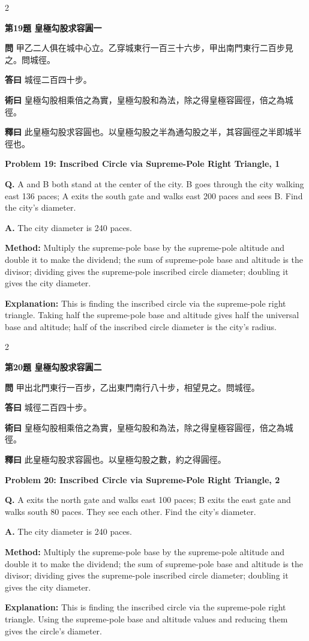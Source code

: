 \documentclass[11pt,a4paper]{article}
\newcommand{\wen}[1]{\noindent\textbf{問} #1\par\smallskip}
\newcommand{\da}[1]{\noindent\textbf{答曰} #1\par\smallskip}
\newcommand{\shu}[1]{\noindent\textbf{術曰} #1\par\smallskip}
\newcommand{\shi}[1]{\noindent\textbf{釋曰} #1\par\smallskip}
\newcommand{\wenE}[1]{\noindent\textbf{Q.} #1\par\smallskip}
\newcommand{\daE}[1]{\noindent\textbf{A.} #1\par\smallskip}
\newcommand{\shuE}[1]{\noindent\textbf{Method:} #1\par\smallskip}
\newcommand{\shiE}[1]{\noindent\textbf{Explanation:} #1\par\smallskip}
\begin{document}
\bigskip

\begin{paracol}{2}

\noindent\textbf{第19題 皇極勾股求容圓一}

\wen{甲乙二人俱在城中心立。乙穿城東行一百三十六步，甲出南門東行二百步見之。問城徑。}
\da{城徑二百四十步。}
\shu{皇極勾股相乘倍之為實，皇極勾股和為法，除之得皇極容圓徑，倍之為城徑。}
\shi{此皇極勾股求容圓也。以皇極勾股之半為通勾股之半，其容圓徑之半即城半徑也。}

\switchcolumn

\noindent\textbf{Problem 19: Inscribed Circle via Supreme-Pole Right Triangle, 1}

\wenE{A and B both stand at the center of the city. B goes through the city walking east 136 paces; A exits the south gate and walks east 200 paces and sees B. Find the city's diameter.}
\daE{The city diameter is 240 paces.}
\shuE{Multiply the supreme-pole base by the supreme-pole altitude and double it to make the dividend; the sum of supreme-pole base and altitude is the divisor; dividing gives the supreme-pole inscribed circle diameter; doubling it gives the city diameter.}
\shiE{This is finding the inscribed circle via the supreme-pole right triangle. Taking half the supreme-pole base and altitude gives half the universal base and altitude; half of the inscribed circle diameter is the city's radius.}

\end{paracol}

\bigskip

\begin{paracol}{2}

\noindent\textbf{第20題 皇極勾股求容圓二}

\wen{甲出北門東行一百步，乙出東門南行八十步，相望見之。問城徑。}
\da{城徑二百四十步。}
\shu{皇極勾股相乘倍之為實，皇極勾股和為法，除之得皇極容圓徑，倍之為城徑。}
\shi{此皇極勾股求容圓也。以皇極勾股之數，約之得圓徑。}

\switchcolumn

\noindent\textbf{Problem 20: Inscribed Circle via Supreme-Pole Right Triangle, 2}

\wenE{A exits the north gate and walks east 100 paces; B exits the east gate and walks south 80 paces. They see each other. Find the city's diameter.}
\daE{The city diameter is 240 paces.}
\shuE{Multiply the supreme-pole base by the supreme-pole altitude and double it to make the dividend; the sum of supreme-pole base and altitude is the divisor; dividing gives the supreme-pole inscribed circle diameter; doubling it gives the city diameter.}
\shiE{This is finding the inscribed circle via the supreme-pole right triangle. Using the supreme-pole base and altitude values and reducing them gives the circle's diameter.}

\end{paracol}
\end{document}
